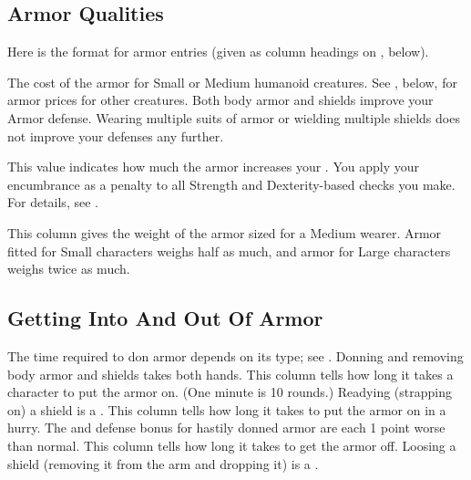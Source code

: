     \subsection{Armor Qualities}
        \par Here is the format for armor entries (given as column headings on , below).

         The cost of the armor for Small or Medium humanoid creatures.
        See , below, for armor prices for other creatures.
         Both body armor and shields improve your Armor defense.
        Wearing multiple suits of armor or wielding multiple shields does not improve your defenses any further.

         This value indicates how much the armor increases your .
        You apply your encumbrance as a penalty to all Strength and Dexterity-based checks you make.
        For details, see .

         This column gives the weight of the armor sized for a Medium wearer. Armor fitted for Small characters weighs half as much, and armor for Large characters weighs twice as much.

    \subsection{Getting Into And Out Of Armor}
        The time required to don armor depends on its type; see . Donning and removing body armor and shields takes both hands.
         This column tells how long it takes a character to put the armor on. (One minute is 10 rounds.) Readying (strapping on) a shield is a .
         This column tells how long it takes to put the armor on in a hurry. The  and defense bonus for hastily donned armor are each 1 point worse than normal.
         This column tells how long it takes to get the armor off. Loosing a shield (removing it from the arm and dropping it) is a .

